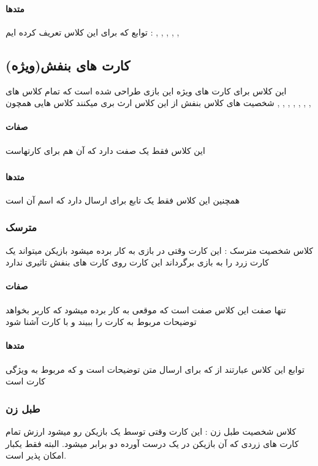 \documentclass[pdf,titlepage,a4paper]{report}
\begin{document}
	\paragraph{متدها}
	توابع که برای این کلاس تعریف کرده ایم :
	 ,  ,  ,  ,  , 
	
	\subsection{کارت های بنفش(ویژه)}
	این کلاس برای کارت های ویژه این بازی طراحی شده است که تمام کلاس های شخصیت های کلاس بنفش از این کلاس ارث بری میکنند
	کلاس هایی همچون  ,  ,  ,  ,  ,  ,  ,   
	\paragraph{صفات}
	این کلاس فقط یک صفت دارد که آن هم برای   کارتهاست
	\subparagraph{}
	
	\paragraph{متدها}
	همچنین این کلاس فقط یک تابع برای ارسال  دارد که اسم آن  است
	\subsubsection{مترسک}
	کلاس شخصیت مترسک : این کارت وقتی در بازی به کار برده میشود بازیکن میتواند یک کارت زرد را به بازی برگرداند 
	این کارت روی کارت های بنفش تاثیری ندارد
	\paragraph{صفات}
	 تنها  صفت این کلاس صفت   است که موقعی به کار برده میشود که کاربر بخواهد توضیحات مربوط به کارت را ببیند و با کارت آشنا شود
	 
	 \paragraph{متدها}
	 توابع این کلاس عبارتند از  
	  که برای ارسال متن توضیحات است 
	 و  که مربوط به ویژگی کارت است
	\subsubsection{طبل زن}
	 کلاس شخصیت طبل زن : این کارت وقتی توسط یک بازیکن رو میشود ارزش تمام کارت های زردی که آن بازیکن در یک درست آورده دو برابر میشود. البته فقط یکبار امکان پذیر است.
\end{document}
